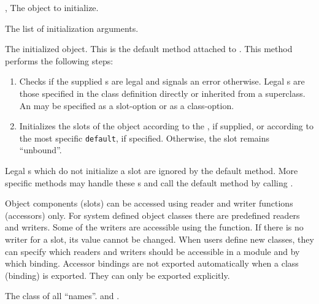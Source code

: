 \begin{optDefinition}
%
\begin{specargs}
    \item[\scref{object}, \classref{object}] The object to initialize.
    \item[\scref{initlist}] The list of initialization arguments.
\end{specargs}
%
\result%
The initialized object.
%
\remarks%
This is the default method attached to .  This method
performs the following steps:

\begin{enumerate}
    \item Checks if the supplied s are legal and signals an error
    otherwise. Legal s are those specified in the class
    definition directly or inherited from a superclass.  An  may
    be specified as a slot-option or as a class-option.

    \item Initializes the slots of the object according to the ,
    if supplied, or according to the most specific {\tt default}, if specified.
    Otherwise, the slot remains ``unbound''.
\end{enumerate}
%
Legal s which do not initialize a slot are ignored by the default
 method.  More specific methods may handle these
s and call the default method by calling
.
%
\end{optDefinition}

%
\begin{optDefinition}
Object components (slots) can be accessed using reader and writer functions
(accessors) only. For system defined object classes there are predefined readers
and writers. Some of the writers are accessible using the 
function. If there is no writer for a slot, its value cannot be changed. When
users define new classes, they can specify which readers and writers should be
accessible in a module and by which binding.  Accessor bindings are not exported
automatically when a class (binding) is exported. They can only be exported
explicitly.

%
%
The class of all ``names''.
%
\seealso%
 and .
%
\end{optDefinition}
